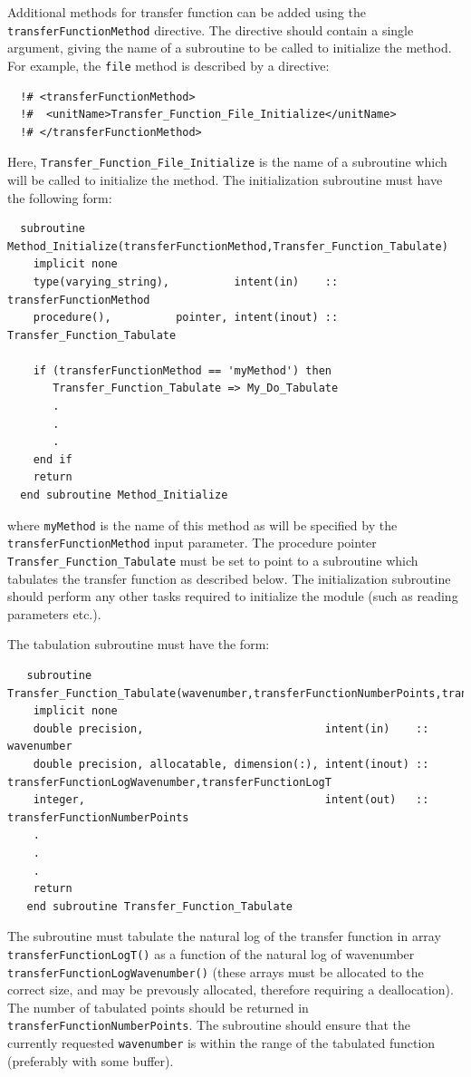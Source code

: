 Additional methods for transfer function can be added using the {\tt transferFunctionMethod} directive. The directive should contain a single argument, giving the name of a subroutine to be called to initialize the method. For example, the {\tt file} method is described by a directive:
\begin{verbatim}
  !# <transferFunctionMethod>
  !#  <unitName>Transfer_Function_File_Initialize</unitName>
  !# </transferFunctionMethod>
\end{verbatim}
Here, {\tt Transfer\_Function\_File\_Initialize} is the name of a subroutine which will be called to initialize the method. The initialization subroutine must have the following form:
\begin{verbatim}
  subroutine Method_Initialize(transferFunctionMethod,Transfer_Function_Tabulate)
    implicit none
    type(varying_string),          intent(in)    :: transferFunctionMethod
    procedure(),          pointer, intent(inout) :: Transfer_Function_Tabulate
    
    if (transferFunctionMethod == 'myMethod') then
       Transfer_Function_Tabulate => My_Do_Tabulate
       .
       .
       .
    end if
    return
  end subroutine Method_Initialize
\end{verbatim}
where {\tt myMethod} is the name of this method as will be specified by the {\tt transferFunctionMethod} input parameter. The procedure pointer {\tt Transfer\_Function\_Tabulate} must be set to point to a subroutine which tabulates the transfer function as described below. The initialization subroutine should perform any other tasks required to initialize the module (such as reading parameters etc.).

The tabulation subroutine must have the form:
\begin{verbatim}
   subroutine Transfer_Function_Tabulate(wavenumber,transferFunctionNumberPoints,transferFunctionWavenumber,transferFunctionT)
    implicit none
    double precision,                            intent(in)    :: wavenumber
    double precision, allocatable, dimension(:), intent(inout) :: transferFunctionLogWavenumber,transferFunctionLogT
    integer,                                     intent(out)   :: transferFunctionNumberPoints
    .
    .
    .
    return
   end subroutine Transfer_Function_Tabulate
\end{verbatim}
The subroutine must tabulate the natural log of the transfer function in array {\tt transferFunctionLogT()} as a function of the natural log of wavenumber {\tt transferFunctionLogWavenumber()} (these arrays must be allocated to the correct size, and may be prevously allocated, therefore requiring a deallocation). The number of tabulated points should be returned in {\tt transferFunctionNumberPoints}. The subroutine should ensure that the currently requested {\tt wavenumber} is within the range of the tabulated function (preferably with some buffer).

